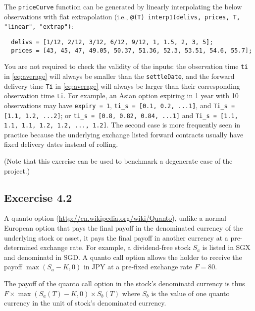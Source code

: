 \documentclass[10pt,a4paper,hidelinks,fleqn]{article}            %
\begin{document}
The \verb=priceCurve= function can be generated by linearly interpolating the below observations with flat extrapolation (i.e., \verb=@(T) interp1(delivs, prices, T, "linear", "extrap")=:
\vspace{-0.6cm}
\begin{verbatim}
  delivs = [1/12, 2/12, 3/12, 6/12, 9/12, 1, 1.5, 2, 3, 5];
  prices = [43, 45, 47, 49.05, 50.37, 51.36, 52.3, 53.51, 54.6, 55.7];
\end{verbatim}
You are not required to check the validity of the inputs:
the observation time \verb=ti= in \eqref{eq:average} will always be smaller than the \verb=settleDate=, and the forward delivery time \verb=Ti= in \eqref{eq:average} will always be larger than their corresponding observation time \verb=ti=.
For example, an Asian option expiring in 1 year with 10 observations may have \verb_expiry = 1_, \verb+ti_s = [0.1, 0.2, ...1]+, and \verb+Ti_s = [1.1, 1.2, ...2]+;
or \verb+ti_s = [0.8, 0.82, 0.84, ...1]+ and \verb+Ti_s = [1.1, 1.1, 1.1, 1.2, 1.2, ..., 1.2]+. The second case is more frequently seen in practice because the underlying exchange listed forward contracts usually have fixed delivery dates instead of rolling.

(Note that this exercise can be used to benchmark a degenerate case of the project.)
\subsection*{Excercise 4.2}
A quanto option (\url{http://en.wikipedia.org/wiki/Quanto}), unlike a normal European option that pays the final payoff in the denominated currency of the underlying stock or asset,
it pays the final payoff in another currency at a pre-determined exchange rate.
For example, a dividend-free stock $S_a$ is listed in SGX and denominatd in SGD. 
A quanto call option allows the holder to receive the payoff $\max(S_a-K, 0)$ in JPY at a pre-fixed exchange rate $F = 80$. 

The payoff of the quanto call option in the stock's denominatd currency is thus 
$F \times \max(S_a(T)-K, 0) \times S_b(T)$ where $S_b$ is the value of one quanto currency in the unit of stock's denominated currency.
\end{document}
